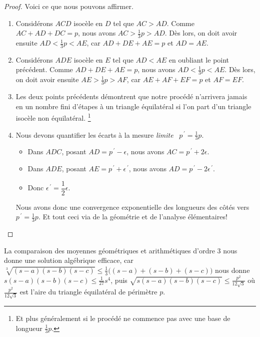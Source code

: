 \begin{proof}
	
	Voici ce que nous pouvons affirmer.
	\begin{enumerate}
		\item Considérons $ACD$ isocèle en $D$ tel que $AC > AD$.
		Comme $AC + AD + DC = p$, nous avons $AC > \frac13p > AD$.
		Dès lors, on doit avoir ensuite  $AD < \frac13p < AE$, car $AD + DE + AE = p$ et $AD = AE$.


		\item Considérons $ADE$ isocèle en $E$ tel que $AD < AE$ en oubliant le point précédent.
		Comme $AD + DE + AE = p$, nous avons $AD < \frac13p < AE$.
		Dès lors, on doit avoir ensuite  $AE > \frac13p > AF$, car $AE + AF + EF = p$ et $AF = EF$.


		\item Les deux points précédents démontrent que notre procédé n'arrivera jamais en un nombre fini d'étapes à un triangle équilatéral si l'on part d'un triangle isocèle non équilatéral.%
		\footnote{
			Et plus généralement si le procédé ne commence pas avec une base de longueur $\frac13 p$.
		}


		\item Nous devons quantifier les écarts à la mesure \og \emph{limite} \fg\ $p^{\,\prime} = \frac13 p$. 
		\begin{itemize}
			\item Dans $ADC$, posant $AD = p^{\,\prime} - \epsilon$, nous avons $AC = p^{\,\prime} + 2 \epsilon$.

			\item Dans $ADE$, posant $AE = p^{\,\prime} + \epsilon^{\,\prime}$, nous avons $AD = p^{\,\prime} - 2 \epsilon^{\,\prime}$.

			\item Donc $\epsilon^{\,\prime} = \dfrac12 \epsilon$.
		\end{itemize}
		
		\noindent
		Nous avons donc une convergence exponentielle des longueurs des côtés vers $p^{\,\prime} = \frac13 p$. Et tout ceci via de la géométrie et de l'analyse élémentaires!
	\end{enumerate}


\end{proof}




\begin{remark}
	La comparaison des moyennes géométriques et arithmétiques d'ordre $3$ nous donne une solution algébrique efficace, car 
	$\sqrt[3]{(s - a)(s - b)(s - c)} \leq \frac13 \big( (s - a) + (s - b) + (s - c) \big)$
	nous donne
	$s(s - a)(s - b)(s - c) \leq \frac{1}{27} s^4$,
	puis
	$\sqrt{s(s - a)(s - b)(s - c)} \leq \frac{p^2}{12 \sqrt{3}}$
	où $\frac{p^2}{12 \sqrt{3}}$ est l'aire du triangle équilatéral de périmètre $p$.
\end{remark}
